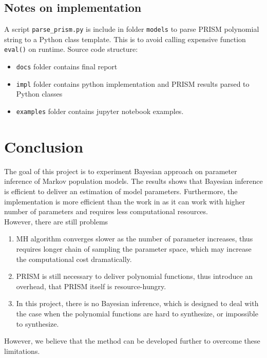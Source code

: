 \documentclass[12pt]{article}
\theoremstyle{definition}
\begin{document}
\subsection{Notes on implementation}
A script \texttt{parse\_prism.py} is include in folder \texttt{models} to parse
PRISM polynomial string to a Python class template. This is to avoid calling
expensive function \texttt{eval()} on runtime. Source code structure:
\begin{itemize}
\item \texttt{docs} folder contains final report
\item \texttt{impl} folder contains python implementation and PRISM results
  parsed to Python classes
\item \texttt{examples} folder contains jupyter notebook examples.
\end{itemize}

\section{Conclusion}
The goal of this project is to experiment Bayesian approach on parameter
inference of Markov population models. The results shows that Bayesian inference
is efficient to deliver an estimation of model parameters. Furthermore, the
implementation is more efficient than the work in \cite{hajnal2019data} as it
can work with higher number of parameters and requires less computational
resources.\\
However, there are still problems
\begin{enumerate}
\item MH algorithm converges slower as the number of parameter increases, thus
  requires longer chain of sampling the parameter space, which may increase the
  computational cost dramatically.
\item PRISM is still necessary to deliver polynomial functions, thus introduce
  an overhead, that PRISM itself is resource-hungry.
\item In this project, there is no Bayesian inference, which is designed to deal
  with the case when the polynomial functions are hard to synthesize, or
  impossible to synthesize.
\end{enumerate}
However, we believe that the method can be developed further to overcome these limitations.


\printbibliography
\end{document}
